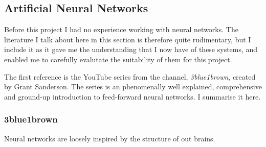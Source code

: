 \subsection{Artificial Neural Networks}

Before this project I had no experience working with neural networks. The literature I talk about here in this section is therefore quite rudimentary, but I include it as it gave me the understanding that I now have of these systems, and enabled me to carefully evalutate the suitability of them for this project.

The first reference is the YouTube series \cite{3blue1brown_but_2017} from the channel, \textit{3blue1brown}, created by Grant Sanderson. The series is an phenomenally well explained, comprehensive and ground-up introduction to feed-forward neural networks. I summarise it here.

\subsubsection{3blue1brown}

Neural networks are loosely inspired by the structure of out brains. 


